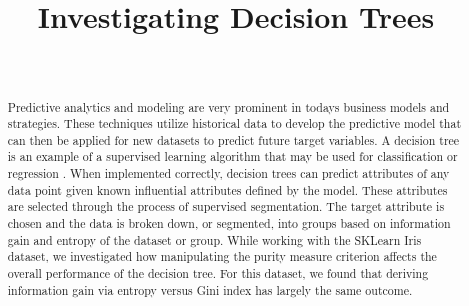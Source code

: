 \documentclass[journal]{IEEEtran}
\begin{document}
\setlength{\emergencystretch}{12pt}
\setlength{\parindent}{10pt}



\lstset{style=mystyle}

\title{Investigating Decision Trees}

\author{
\\
}

\maketitle

\begin{abstract}
\label{log:abstract}
Predictive analytics and modeling are very prominent in today\textquotesingle s business models and strategies. These techniques utilize historical data to develop the predictive model that can then be applied for new datasets to predict future target variables. A decision tree is an example of a supervised learning algorithm that may be used for classification or regression \cite{b1}. When implemented correctly, decision trees can predict attributes of any data point given known influential attributes defined by the model. These attributes are selected through the process of supervised segmentation. The target attribute is chosen and the data is broken down, or segmented, into groups based on information gain and entropy of the dataset or group. While working with the SKLearn Iris dataset, we investigated how manipulating the purity measure criterion affects the overall performance of the decision tree. For this dataset, we found that deriving information gain via entropy versus Gini index has largely the same outcome. 
\end{abstract}
\end{document}
